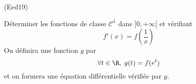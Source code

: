 \begin{tiny}(Eed19)\end{tiny} Déterminer les fonctions de classe $\mathcal{C}^1$ dans $]0,+\infty[$ et vérifiant 
\begin{displaymath}
  f'(x) = f(\frac{1}{x})
\end{displaymath}
On définira une fonction $g$ par
\begin{displaymath}
  \forall t\in \R, \; g(t) = f(e^{t})
\end{displaymath}
et on formera une équation différentielle vérifiée par $g$.
